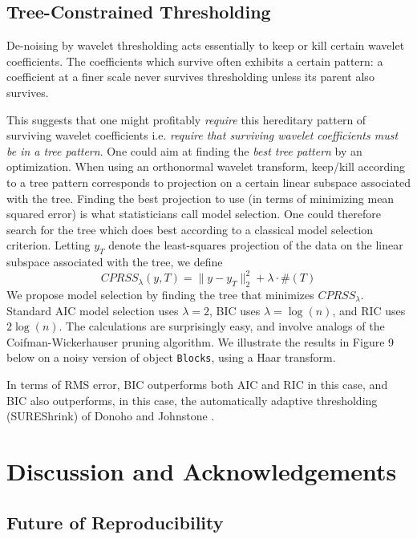 \subsection{Tree-Constrained Thresholding}

De-noising by wavelet thresholding acts essentially to keep or
kill certain wavelet coefficients. 
The coefficients which survive often
exhibits a certain pattern: a coefficient at a finer
scale never survives thresholding unless
its parent also survives. 

This suggests that one might profitably {\it require} this hereditary pattern
of surviving wavelet coefficients i.e. {\it require that surviving wavelet
coefficients must be in a tree pattern}.  One could aim at finding
the {\it best tree pattern} by an optimization.
When using an orthonormal wavelet transform, keep/kill
according to a tree
pattern corresponds to projection on a certain linear subspace
associated with the tree.  Finding
the best projection to use (in terms of minimizing mean squared error)
is what statisticians call model selection.  One could therefore
search for the tree which does best according to a 
classical model selection criterion.  
Letting $y_T$ denote the least-squares projection of the
data on the linear subspace associated with the tree, we define
\[
      CPRSS_\lambda (y,T) = \| y - y_T \|_2^2 + \lambda \cdot \#(T)
\]
We propose model selection by finding the tree that 
minimizes $CPRSS_\lambda$.
Standard AIC model selection uses $\lambda=2$, BIC uses
$\lambda = \log(n)$, and RIC uses $2 \log(n)$.
The calculations are surprisingly easy, and involve
analogs of the Coifman-Wickerhauser pruning algorithm.
We illustrate the results in Figure 9 below on a noisy version
of object {\tt Blocks}, using a Haar transform.


In terms of RMS error, BIC outperforms both AIC and RIC
in this case, and BIC also outperforms, in this case, the
automatically adaptive thresholding (SUREShrink)
of Donoho and Johnstone \cite{AdaptSmooth}.

\section{Discussion and Acknowledgements}


\subsection{Future of Reproducibility}

